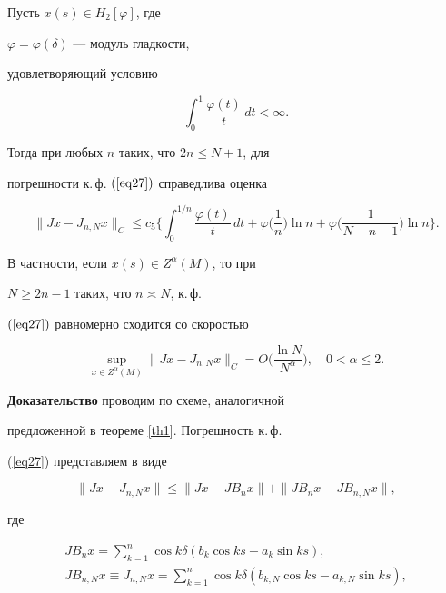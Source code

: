 \begin{thm}\label{th3}


Пусть $x(s)\in H_2[\varphi]$, где


$\varphi=\varphi(\delta)$ --- модуль гладкости,


удовлетворяющий условию


$$


\int_0^1\frac{\varphi(t)}{t}\,dt<\infty.


$$


Тогда при любых $n$ таких, что $2n\leq N+1$, для


погрешности к.\,ф. $(\ref{eq27})$ справедлива оценка


$$


\|Jx-J_{n,N}x\|_C\leq


c_5\bigg\{\int_0^{1/n}\frac{\varphi(t)}{t}\, dt +


\varphi\bigg(\frac{1}{n}\bigg)\ln n +


\varphi\bigg(\frac{1}{N-n-1}\bigg)\ln n\bigg\}.


$$


В частности, если $x(s)\in Z^\alpha(M)$, то при


$N\geq2n-1$ таких, что $n\asymp N$, к.\,ф.


$(\ref{eq27})$ равномерно сходится со скоростью


$$


\sup_{x\in Z^\alpha(M)}\|Jx-J_{n,N}x\|_C=O\bigg(\frac{\ln


N}{N^\alpha}\bigg),\quad0<\alpha\leq2.


$$


\end{thm}








{\bf Доказательство} проводим по схеме, аналогичной


предложенной в теореме \ref{th1}.  Погрешность к.\,ф.


(\ref{eq27}) представляем в виде


\begin{equation}\label{eq28}


\|Jx-J_{n,N}x\|\leq


\|Jx-JB_nx\|+\|JB_nx-JB_{n,N}x\|,


\end{equation}


где


\begin{gather*}


JB_nx=\sum_{k=1}^n\cos k\delta (b_k\cos ks - a_k\sin ks),\\


JB_{n,N}x\equiv J_{n,N}x = \sum_{k=1}^n\cos


k\delta(b_{k,N}\cos ks - a_{k,N}\sin ks),


\end{gather*}



